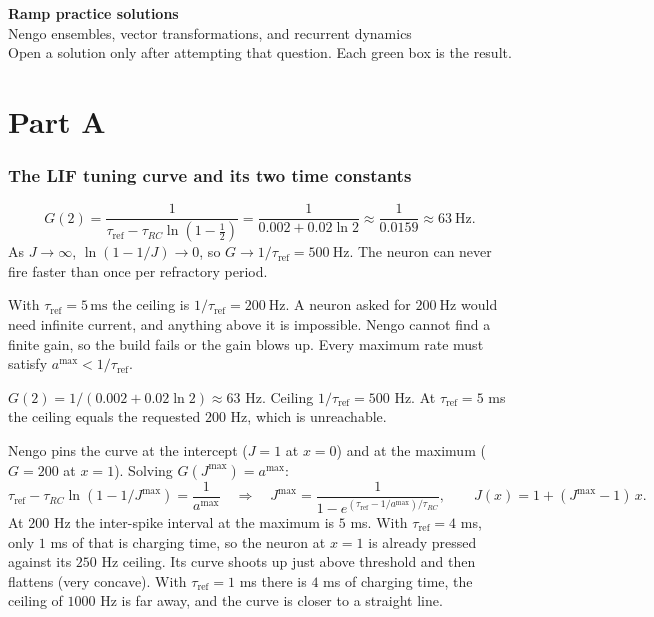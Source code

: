 \documentclass[11pt,letterpaper]{article}
\newcommand{\tref}{\tau_{\mathrm{ref}}}
\newcommand{\trc}{\tau_{RC}}
\newcommand{\ans}[1]{\par\vspace{4pt}{\bfseries #1}\quad}
\begin{document}
\begin{center}
{\Large\bfseries Ramp practice solutions}\\[2pt]
{\large Nengo ensembles, vector transformations, and recurrent dynamics}\\[4pt]
Open a solution only after attempting that question. Each green box is the result.
\end{center}

\part*{Part A}

\section{The LIF tuning curve and its two time constants}

\ans{Q1}
\[
G(2) = \frac{1}{\tref - \trc\ln(1 - \tfrac12)} = \frac{1}{0.002 + 0.02\ln 2} \approx \frac{1}{0.0159} \approx 63\ \mathrm{Hz}.
\]
As $J \to \infty$, $\ln(1 - 1/J) \to 0$, so $G \to 1/\tref = 500\ \mathrm{Hz}$. The neuron can never fire faster than once per refractory period.

With $\tref = 5\,\mathrm{ms}$ the ceiling is $1/\tref = 200\ \mathrm{Hz}$. A neuron asked for $200\ \mathrm{Hz}$ would need infinite current, and anything above it is impossible. Nengo cannot find a finite gain, so the build fails or the gain blows up. Every maximum rate must satisfy $a^{\max} < 1/\tref$.
\begin{result}
$G(2) = 1/(0.002 + 0.02\ln 2) \approx 63$ Hz. Ceiling $1/\tref = 500$ Hz. At $\tref = 5$ ms the ceiling equals the requested $200$ Hz, which is unreachable.
\end{result}

\ans{Q2}
Nengo pins the curve at the intercept ($J = 1$ at $x = 0$) and at the maximum ($G = 200$ at $x = 1$). Solving $G(J^{\max}) = a^{\max}$:
\[
\tref - \trc\ln(1 - 1/J^{\max}) = \frac{1}{a^{\max}} \quad\Longrightarrow\quad J^{\max} = \frac{1}{1 - e^{(\tref - 1/a^{\max})/\trc}},
\qquad J(x) = 1 + (J^{\max} - 1)\,x.
\]
At $200$ Hz the inter-spike interval at the maximum is $5$ ms. With $\tref = 4$ ms, only $1$ ms of that is charging time, so the neuron at $x = 1$ is already pressed against its $250$ Hz ceiling. Its curve shoots up just above threshold and then flattens (very concave). With $\tref = 1$ ms there is $4$ ms of charging time, the ceiling of $1000$ Hz is far away, and the curve is closer to a straight line.
\end{document}
